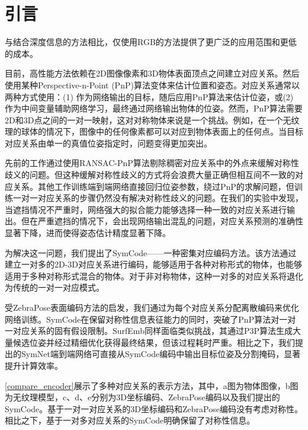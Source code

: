 \section{引言}
\par 与结合深度信息\cite{9191119, 9429889, 9933183, 9206072, 2024hipose}的方法相比，仅使用RGB的方法\cite{8765585, billings2019silhonet, hybridpose}提供了更广泛的应用范围和更低的成本。

目前，高性能方法\cite{wang2021gdr, su2022zebrapose}依赖在2D图像像素和3D物体表面顶点之间建立对应关系。然后使用某种Perspective-n-Point (PnP)算法\cite{EPnP}变体来估计位置和姿态。对应关系通常以两种方式使用：(1) 作为网络输出的目标\cite{su2022zebrapose}，随后应用PnP算法来估计位姿，或(2) 作为中间变量辅助网络学习，最终通过网络输出物体的位姿\cite{wang2021gdr}。然而，PnP算法需要2D和3D点之间的一对一映射，这对对称物体来说是一个挑战。例如，在一个无纹理的球体的情况下，图像中的任何像素都可以对应到物体表面上的任何点。当目标对应关系由单一的真值位姿指定时，问题变得更加突出。

先前的工作\cite{pvnet, park2019pix2pose, su2022zebrapose}通过使用RANSAC-PnP算法剔除稠密对应关系中的外点来缓解对称性歧义的问题。但这种缓解对称性歧义的方式将会浪费大量正确但相互间不一致的对应关系。其他工作\cite{wang2021gdr, di2021so}训练端到端网络直接回归位姿参数，绕过PnP的求解问题，但训练一对一对应关系的步骤仍然没有解决对称性歧义的问题。在我们的实验中发现，当遮挡情况不严重时，网络强大的拟合能力能够选择一种一致的对应关系进行输出。但在严重遮挡的情况下，会出现网络输出混乱的问题，对应关系预测的准确性显著下降，进而使得姿态估计精度显著下降。

\par 为解决这一问题，我们提出了SymCode——一种密集对应编码方法。该方法通过建立一对多的2D-3D对应关系进行编码，能够适用于各种对称形式的物体，也能够适用于多种对称形式混合的物体。对于非对称物体，这种一对多的对应关系将退化为传统的一对一对应模式。

\par 受ZebraPose\cite{su2022zebrapose}表面编码方法的启发，我们通过为每个对应关系分配离散编码来优化网络训练。SymCode在保留对称性信息表征能力的同时，突破了PnP算法对一对一对应关系的固有假设限制。SurfEmb\cite{haugaard2022surfemb}同样面临类似挑战，其通过P3P算法生成大量候选位姿并经过精细优化获得最终结果，但该过程耗时严重。相比之下，我们提出的SymNet端到端网络可直接从SymCode编码中输出目标位姿及分割掩码，显著提升计算效率。

\par \autoref{compare_encoder}展示了多种对应关系的表示方法，其中，a图为物体图像，b图为无纹理模型，c、d、e分别为3D坐标编码、ZebraPose编码\cite{su2022zebrapose}以及我们提出的SymCode。基于一对一对应关系的3D坐标编码和ZebraPose编码没有考虑对称性。相比之下，基于一对多对应关系的SymCode明确保留了对称性信息。

